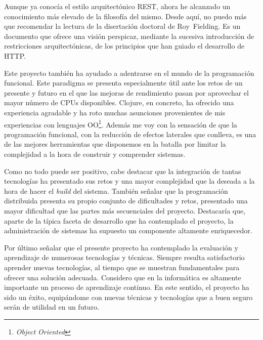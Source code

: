 Aunque ya conocía el estilo arquitectónico REST, ahora he alcanzado un
conocimiento más elevado de la filosofía del mismo. Desde aquí, no
puedo más que recomendar la lectura de la disertación doctoral de
Roy~Fielding\cite{REST}. Es un documento que ofrece una visión
perspicaz, mediante la sucesiva introducción de restricciones
arquitectónicas, de los principios que han guiado el desarrollo de
HTTP.

Este proyecto también ha ayudado a adentrarse en el mundo de la
programación funcional\cite{FUNCTIONAL}. Este paradigma se presenta
especialmente útil ante los retos de un presente y futuro en el que
las mejoras de rendimiento pasan por aprovechar el mayor número de
CPUs disponibles. Clojure, en concreto, ha ofrecido una experiencia
agradable y ha roto muchas asunciones provenientes de mis experiencias
con lenguajes OO\footnote{\emph{Object Oriented}}. Además me voy con
la sensación de que la programación funcional, con la reducción de
efectos laterales que conlleva, es una de las mejores herramientas que
disponemos en la batalla por limitar la complejidad a la hora de
construir y comprender sistemas.
%

Como no todo puede ser positivo, cabe destacar que la integración de
tantas tecnologías ha presentado sus retos y una mayor complejidad que
la deseada a la hora de hacer el \emph{build} del sistema. También
señalar que la programación distribuida presenta su propio conjunto de
dificultades y retos, presentado una mayor dificultad que las partes
más secuenciales del proyecto. Destacaría que, aparte de la típica
faceta de desarrollo que ha contemplado el proyecto, la administración
de sistemas ha supuesto un componente altamente enriquecedor.

Por último señalar que el presente proyecto ha contemplado la
evaluación y aprendizaje de numerosas tecnologías y técnicas. Siempre
resulta satisfactorio aprender nuevas tecnologías, al tiempo que se
muestran fundamentales para ofrecer una solución adecuada. Considero
que en la informática es altamente importante un proceso de
aprendizaje continuo. En este sentido, el proyecto ha sido un éxito,
equipándome con nuevas técnicas y tecnologías que a buen seguro serán
de utilidad en un futuro.

